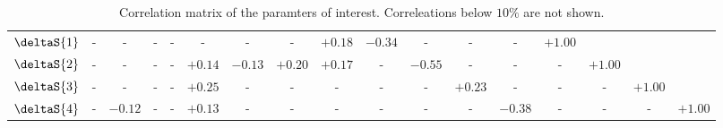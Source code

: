 \begin{sidewaystable}[p!]
\begin{center}
\begin{tabular}{ccccccccccccccccc}
$          \deltaS{1}$ &     -    &     -    &     -    &     -    &     -    &     -    &     -    &  $+0.18$ &  $-0.34$ &     -    &     -    &     -    &  $+1.00$ &  &  &  \\ 
$          \deltaS{2}$ &     -    &     -    &     -    &     -    &  $+0.14$ &  $-0.13$ &  $+0.20$ &  $+0.17$ &     -    &  $-0.55$ &     -    &     -    &     -    &  $+1.00$ &  &  \\ 
$          \deltaS{3}$ &     -    &     -    &     -    &     -    &  $+0.25$ &     -    &     -    &     -    &     -    &     -    &  $+0.23$ &     -    &     -    &     -    &  $+1.00$ &  \\ 
$          \deltaS{4}$ &     -    &  $-0.12$ &     -    &     -    &  $+0.13$ &     -    &     -    &     -    &     -    &     -    &     -    &  $-0.38$ &     -    &     -    &     -    &  $+1.00$ \\
\end{tabular}
\end{center}
\caption{Correlation matrix of the paramters of interest. Correleations below $10\%$ are not shown. }
\label{correlation_matrix}
\end{sidewaystable}
